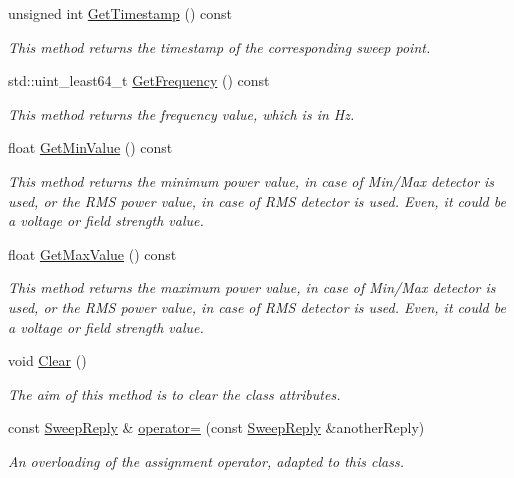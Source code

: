 \begin{DoxyCompactItemize}
unsigned int \hyperlink{classSweepReply_a47ccfb08ddaa045ad170ce3583548ff2}{Get\+Timestamp} () const
\begin{DoxyCompactList}\small\item\em This method returns the timestamp of the corresponding sweep point. \end{DoxyCompactList}\item 
\mbox{\label{classSweepReply_a68b46991b6ebf101ad8fa486831de9ed}} 
std\+::uint\+\_\+least64\+\_\+t \hyperlink{classSweepReply_a68b46991b6ebf101ad8fa486831de9ed}{Get\+Frequency} () const
\begin{DoxyCompactList}\small\item\em This method returns the frequency value, which is in Hz. \end{DoxyCompactList}\item 
\mbox{\label{classSweepReply_a77e184e7694b372de2100186cced425c}} 
float \hyperlink{classSweepReply_a77e184e7694b372de2100186cced425c}{Get\+Min\+Value} () const
\begin{DoxyCompactList}\small\item\em This method returns the minimum power value, in case of Min/\+Max detector is used, or the R\+MS power value, in case of R\+MS detector is used. Even, it could be a voltage or field strength value. \end{DoxyCompactList}\item 
\mbox{\label{classSweepReply_af7332c7b0b73d2e3156b0da48ce78ff6}} 
float \hyperlink{classSweepReply_af7332c7b0b73d2e3156b0da48ce78ff6}{Get\+Max\+Value} () const
\begin{DoxyCompactList}\small\item\em This method returns the maximum power value, in case of Min/\+Max detector is used, or the R\+MS power value, in case of R\+MS detector is used. Even, it could be a voltage or field strength value. \end{DoxyCompactList}\item 
\mbox{\label{classSweepReply_a8273b23b929bfae3be36d2b061c7a793}} 
void \hyperlink{classSweepReply_a8273b23b929bfae3be36d2b061c7a793}{Clear} ()
\begin{DoxyCompactList}\small\item\em The aim of this method is to clear the class attributes. \end{DoxyCompactList}\item 
const \hyperlink{classSweepReply}{Sweep\+Reply} \& \hyperlink{classSweepReply_a37bfa46a9b437720ba551dd68875eeaa}{operator=} (const \hyperlink{classSweepReply}{Sweep\+Reply} \&another\+Reply)
\begin{DoxyCompactList}\small\item\em An overloading of the assignment operator, adapted to this class. \end{DoxyCompactList}\end{DoxyCompactItemize}
